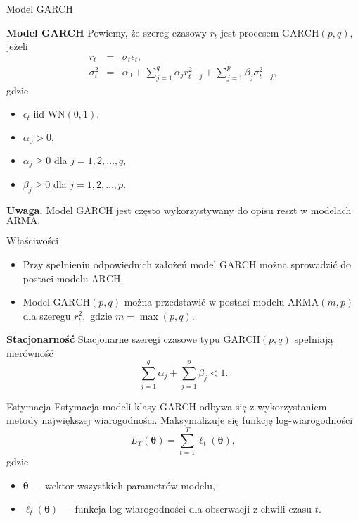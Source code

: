 \documentclass[a4paper, 11pt]{beamer}
\begin{document}
	\begin{frame}{Model GARCH}
		\begin{block}{\textbf{Model GARCH}}
			Powiemy, że szereg czasowy $r_t$ jest procesem $\mbox{GARCH}\left(p,q\right),$ jeżeli \begin{eqnarray*}
				r_t & = & \sigma_t \epsilon_t,\\
				\sigma^2_t & = & \alpha_0 + \sum_{j=1}^{q} \alpha_j r_{t-j}^2 + \sum_{j=1}^{p} \beta_j \sigma_{t-j}^2,
			\end{eqnarray*} gdzie
			\begin{itemize}
				\item $\epsilon_t \mbox{ iid } \mbox{WN}\left(0, 1\right),$
				\item $\alpha_0 > 0,$
				\item $\alpha_j \geq 0$ dla $j=1,2,\ldots,q,$
				\item $\beta_j \geq 0$ dla $j=1,2,\ldots,p.$
			\end{itemize}
		\end{block}
		\begin{alert}{\textbf{Uwaga.}}
			Model $\mbox{GARCH}$ jest często wykorzystywany do opisu reszt w modelach $\mbox{ARMA}.$
		\end{alert}
	\end{frame}
	
	\begin{frame}{Właściwości}
		\begin{itemize}
			\item Przy spełnieniu odpowiednich założeń model $\mbox{GARCH}$ można sprowadzić
				do postaci modelu $\mbox{ARCH}.$
			\item Model $\mbox{GARCH}\left(p,q\right)$ można przedstawić w postaci modelu
				$\mbox{ARMA}\left(m,p\right)$ dla szeregu $r_t^2,$ gdzie $m=\max\left(p,q\right).$
		\end{itemize}
		\begin{block}{\textbf{Stacjonarność}}
			Stacjonarne szeregi czasowe typu $\mbox{GARCH}\left(p,q\right)$ spełniają nierówność \[
				\sum_{j=1}^{q} \alpha_j + \sum_{j=1}^{p} \beta_j < 1.
			\]
		\end{block}
	\end{frame}
	
	\begin{frame}{Estymacja}
		Estymacja modeli klasy GARCH odbywa się z wykorzystaniem metody
		największej wiarogodności. Maksymalizuje się funkcję log-wiarogodności \[
			L_T\left(\boldsymbol{\theta}\right) =
				\sum_{t=1}^{T} \ell_t\left(\boldsymbol{\theta}\right),
		\] gdzie
		\begin{itemize}
			\item $\boldsymbol{\theta}$ --- wektor wszystkich parametrów modelu,
			\item $\ell_t\left(\boldsymbol{\theta}\right)$ --- funkcja log-wiarogodności
				dla obserwacji z chwili czasu $t.$
		\end{itemize}
	\end{frame}
	
\end{document}
